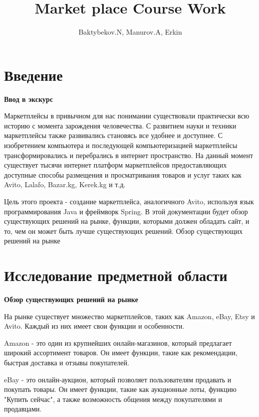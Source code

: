 
\title{Market place Course Work}

\author{Baktybekov.N, Manurov.A, Erkin}



\maketitle

\newpage
\tableofcontents{}
\setcounter{page}{1}

\newpage
{}
\section*{Введение}

\textbf{Ввод в экскурс}


Маркетплейсы в привычном для нас понимании существовали практически всю историю с момента зарождения человечества. С развитием науки и техники маркетплейсы также развивались становясь все удобнее и доступнее.
С изобретением компьютера и последующей компьютеризацией маркетплейсы трансформировались и перебрались в интернет пространство.
На данный момент существует тысячи интернет платформ маркетплейсов предоставляющих доступные способы размещения и просматривания товаров и услуг таких как Avito, Lalafo, Bazar.kg, Kerek.kg  и т.д. 

Цель этого проекта - создание маркетплейса, аналогичного Avito, используя язык программирования Java и фреймворк Spring. В этой документации будет обзор существующих решений на рынке, функции, которыми должен обладать сайт, и то, чем он может быть лучше существующих решений.
Обзор существующих решений на рынке



\section{Исследование предметной области}
\textbf{Обзор существующих решений на рынке}

На рынке существует множество маркетплейсов, таких как Amazon, eBay, Etsy и Avito. Каждый из них имеет свои функции и особенности.

Amazon - это один из крупнейших онлайн-магазинов, который предлагает широкий ассортимент товаров. Он имеет функции, такие как рекомендации, быстрая доставка и отзывы покупателей.

eBay - это онлайн-аукцион, который позволяет пользователям продавать и покупать товары. Он имеет функции, такие как аукционные лоты, функцию "Купить сейчас", а также возможность общения между покупателями и продавцами.

